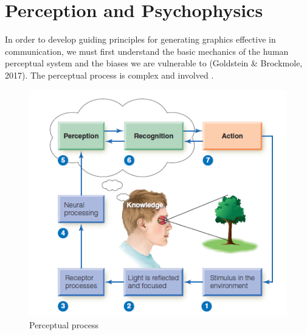 \documentclass[print]{nuthesis}
\begin{document}
\hypertarget{perception-and-psychophysics}{%
\section{Perception and Psychophysics}\label{perception-and-psychophysics}}


In order to develop guiding principles for generating graphics effective in communication, we must first understand the basic mechanics of the human perceptual system and the biases we are vulnerable to (Goldstein \& Brockmole, 2017).
The perceptual process is complex and involved .

\begin{figure}[tbp]

{\centering \includegraphics[width=0.75\linewidth,]{images/perceptual-process-goldsein-pg5} 

}

\caption{Perceptual process}\label{fig:perceptual-process}
\end{figure}
\end{document}

